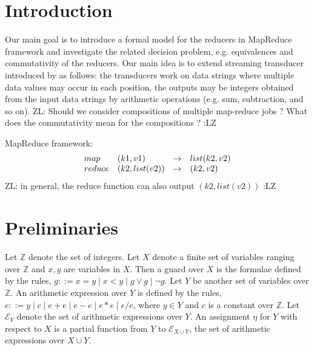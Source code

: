 \documentclass[11pt]{article}
\title{\Name}
\author{Yu-Fang Chen, Lei Song, Zhilin Wu}
\def\Ee{{\mathcal{E} }}
\def\Ii{{\mathbb{Z} }}
\newcommand{\zhilin}[1]{\color{cyan} {ZL: #1 :LZ} \color{black}}
\begin{document}
\maketitle

\begin{abstract}
In this note, we define streaming data string to integer transducers (SDSIT), motivated by modeling the reducers in the MapReduce framework. We investigate the theoretical properties of SDSIT and the decision problems of SDSIT. 
\end{abstract}

\section{Introduction}

Our main goal is to introduce a formal model for the reducers in MapReduce framework and investigate the related decision problem, e.g. equivalences and commutativity of the reducers. Our main idea is to extend streaming transducer introduced by \cite{RP11} as follows: the transducers work on data strings where multiple data values may occur in each position, the outputs may be integers obtained from the input data strings by arithmetic operations (e.g. sum, subtraction, and so on). \zhilin{Should we consider compositions of multiple map-reduce jobs ? What does the commutativity mean for the compositions ?} 

MapReduce framework:
\[
\begin{array}{l l c l} 
map & (k1,v1) & \rightarrow & list(k2,v2)\\
reduce & (k2,list(v2)) & \rightarrow & (k2,v2) 
\end{array}
\]
\zhilin{in general, the reduce function can also output $(k2, list(v2))$}

\section{Preliminaries}

Let $\Ii$ denote the set of integers. Let $X$ denote a finite set of variables ranging over $\Ii$ and $x,y$ are variables in $X$. Then a guard over $X$ is the formulae defined by the rules, $g::= x = y \mid x < y \mid g \vee g \mid \neg g$. Let $Y$ be another set of variables over $\Ii$. An arithmetic expression over $Y$ is defined by the rules, $e::= y \mid c \mid e + e \mid e-e \mid e * e \mid e / e$, where $y \in Y$ and $c$ is a constant over $\Ii$. Let $\Ee_Y$ denote the set of arithmetic expressions over $Y$. An assignment $\eta$ for $Y$ with respect to $X$ is a partial function from $Y$ to $\Ee_{X \cup Y}$, the set of arithmetic expressions over $X \cup Y$.
\end{document}
